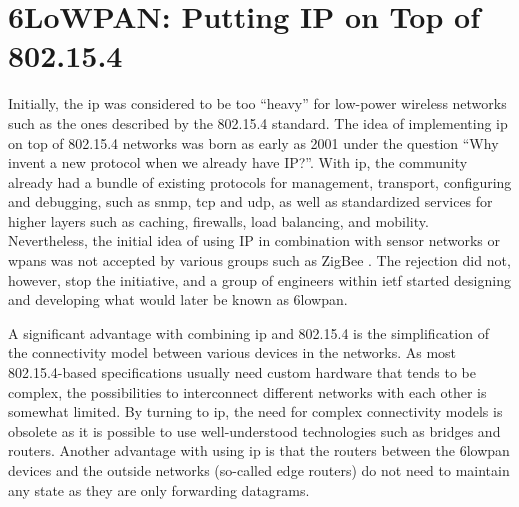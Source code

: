






\section{6LoWPAN: Putting IP on Top of 802.15.4}


Initially, the \gls{ip} was considered to be too ``heavy'' for low-power wireless networks such as the ones described by the 802.15.4 standard. The idea of implementing \gls{ip} on top of 802.15.4 networks was born as early as 2001 under the question ``Why invent a new protocol when we already have IP?''\cite{Mulligan2007}. With \gls{ip}, the community already had a bundle of existing protocols for management, transport, configuring and debugging, such as \gls{snmp}, \gls{tcp} and \gls{udp}, as well as standardized services for higher layers such as caching, firewalls, load balancing, and mobility. Nevertheless, the initial idea of using IP in combination with sensor networks or \gls{wpan}s was not accepted by various groups such as ZigBee \cite{Mulligan2007}. The rejection did not, however, stop the initiative, and a group of engineers within \gls{ietf} started designing and developing what would later be known as \gls{6lowpan}.

A significant advantage with combining \gls{ip} and 802.15.4 is the simplification of the connectivity model between various devices in the networks. As most 802.15.4-based specifications usually need custom hardware that tends to be complex, the possibilities to interconnect different networks with each other is somewhat limited. By turning to \gls{ip}, the need for complex connectivity models is obsolete as it is possible to use well-understood technologies such as bridges and routers. Another advantage with using \gls{ip} is that the routers between the \gls{6lowpan} devices and the outside networks (so-called edge routers) do not need to maintain any state as they are only forwarding datagrams.

